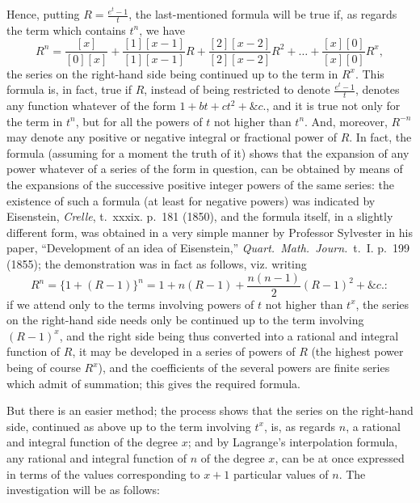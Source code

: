 \documentclass[11pt,a4paper]{book}
\begin{document}
Hence, putting $R=\frac{e^t-1}{t}$, the last-mentioned formula will be true if, as regards the term which contains $t^n$, we have
\[
R^n=\frac{[x]}{[0][x]}+\frac{[1][x-1]}{[1][x-1]}R+\frac{[2][x-2]}{[2][x-2]}R^2+\ldots+\frac{[x][0]}{[x][0]}R^x,
\]
the series on the right-hand side being continued up to the term in $R^x$. This formula is, in fact, true if $R$, instead of being restricted to denote $\frac{e^t-1}{t}$, denotes any function whatever of the form $1+bt+ct^2+\&c.$, and it is true not only for the term in $t^n$, but for all the powers of $t$ not higher than $t^n$. And, moreover, $R^{-n}$ may denote any positive or negative integral or fractional power of $R$. In fact, the formula (assuming for a moment the truth of it) shows that the expansion of any power whatever of a series of the form in question, can be obtained by means of the expansions of the successive positive integer powers of the same series: the existence of such a formula (at least for negative powers) was indicated by Eisenstein, \textit{Crelle}, t.~xxxix. p.~181 (1850), and the formula itself, in a slightly different form, was obtained in a very simple manner by Professor Sylvester in his paper, ``Development of an idea of Eisenstein,'' \textit{Quart.\ Math.\ Journ.}\ t.~I. p.~199 (1855); the demonstration was in fact as follows, viz. writing
\[
R^n=\{1+(R-1)\}^n=1+n(R-1)+\frac{n(n-1)}{2}(R-1)^2+\&c.:
\]
if we attend only to the terms involving powers of $t$ not higher than $t^x$, the series on the right-hand side needs only be continued up to the term involving $(R-1)^x$, and the right side being thus converted into a rational and integral function of $R$, it may be developed in a series of powers of $R$ (the highest power being of course $R^x$), and the coefficients of the several powers are finite series which admit of summation; this gives the required formula.

But there is an easier method; the process shows that the series on the right-hand side, continued as above up to the term involving $t^x$, is, as regards $n$, a rational and integral function of the degree $x$; and by Lagrange's interpolation formula, any rational and integral function of $n$ of the degree $x$, can be at once expressed in terms of the values corresponding to $x+1$ particular values of $n$. The investigation will be as follows:
\end{document}
